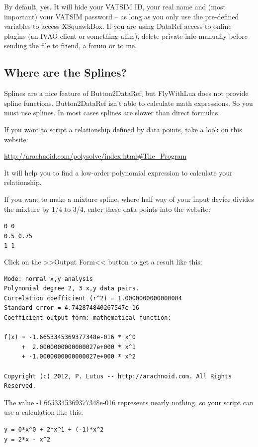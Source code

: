 \documentclass[11pt,parskip=half,a4paper]{scrartcl}
\begin{document}
By default, yes. It will hide your VATSIM ID, your real name and (most important) your VATSIM password -- as long as you only use the pre-defined variables to access XSquawkBox. If you are using DataRef access to online plugins (an IVAO client or something alike), delete private info manually before sending the file to friend, a forum or to me.

\subsection{Where are the Splines?}

Splines are a nice feature of Button2DataRef, but FlyWithLua does not provide spline functions. Button2DataRef isn't able to calculate math expressions. So you must use splines. In most cases splines are slower than direct formulas.

If you want to script a relationship defined by data points, take a look on this website:

\url{http://arachnoid.com/polysolve/index.html#The_Program}

It will help you to find a low-order polynomial expression to calculate your relationship.

If you want to make a mixture spline, where half way of your input device divides the mixture by 1/4 to 3/4, enter these data points into the website:

\verb|0 0|\\
\verb|0.5 0.75|\\
\verb|1 1|

Click on the >>Output Form<< button to get a result like this:

\begin{lstlisting}[firstnumber=1]
Mode: normal x,y analysis
Polynomial degree 2, 3 x,y data pairs.
Correlation coefficient (r^2) = 1.0000000000000004
Standard error = 4.742874840267547e-16
Coefficient output form: mathematical function:

f(x) = -1.6653345369377348e-016 * x^0
     +  2.0000000000000027e+000 * x^1
     + -1.0000000000000027e+000 * x^2

Copyright (c) 2012, P. Lutus -- http://arachnoid.com. All Rights Reserved.
\end{lstlisting}

The value -1.6653345369377348e-016 represents nearly nothing, so your script can use a calculation like this:

\verb|y = 0*x^0 + 2*x^1 + (-1)*x^2|\\
\verb|y = 2*x - x^2|
\end{document}

